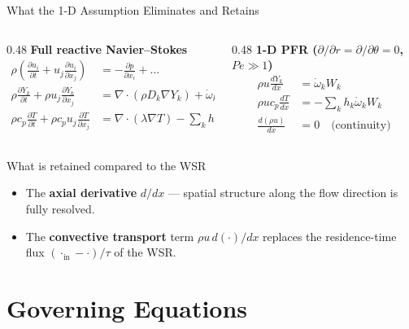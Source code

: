 \documentclass[12pt,aspectratio=169]{beamer}
\newcommand{\ddx}[1]{\frac{d#1}{dx}}
\newcommand{\pd}[2]{\frac{\partial #1}{\partial #2}}
\newcommand{\wdot}{\dot{\omega}}
\begin{document}
\begin{frame}{What the 1-D Assumption Eliminates and Retains}

  \begin{columns}[t]
    \begin{column}{0.48\textwidth}
      \textbf{Full reactive Navier--Stokes}
      \begin{align*}
        \rho\left(\pd{u_i}{t} + u_j\pd{u_i}{x_j}\right)
          &= -\pd{p}{x_i} + \ldots\\
        \rho\pd{Y_k}{t} + \rho u_j\pd{Y_k}{x_j}
          &= \nabla\cdot(\rho D_k\nabla Y_k) + \wdot_k W_k\\
        \rho c_p\pd{T}{t} + \rho c_p u_j\pd{T}{x_j}
          &= \nabla\cdot(\lambda\nabla T) - \textstyle\sum_k h_k\wdot_k W_k
      \end{align*}
    \end{column}
    \begin{column}{0.48\textwidth}
      \textbf{1-D PFR \quad ($\partial/\partial r = \partial/\partial\theta = 0$,
      $Pe \gg 1$)}
      \begin{align*}
        \rho u \ddx{Y_k}
          &= \wdot_k W_k \\[8pt]
        \rho u c_p \ddx{T}
          &= -\sum_k h_k \wdot_k W_k \\[8pt]
        \ddx{(\rho u)}
          &= 0 \quad \text{(continuity)}
      \end{align*}
    \end{column}
  \end{columns}

  \medskip
  \begin{block}{What is retained compared to the WSR}
    \begin{itemize}
      \item The \textbf{axial derivative} $d/dx$ --- spatial structure
            along the flow direction is fully resolved.
      \item The \textbf{convective transport} term $\rho u\,d(\cdot)/dx$
            replaces the residence-time flux $(\cdot_{\text{in}} - \cdot)/\tau$
            of the WSR.
    \end{itemize}
  \end{block}
\end{frame}

\section{Governing Equations}
\end{document}
